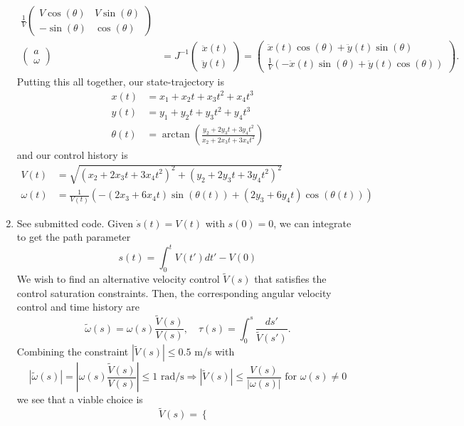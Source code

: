 \documentclass[12pt]{article}
\begin{document}
\begin{enumerate}
\begin{align*}
		\frac{1}{V}\left(\begin{array}{cc}
		V\cos(\theta) & V\sin(\theta) \\
		-\sin(\theta) & \cos(\theta)
		\end{array}\right) \\
		\left(\begin{array}{c}
		a \\
		\omega
		\end{array}\right) &=
		J^{-1}\left(\begin{array}{c}
		\ddot x(t) \\
		\ddot y(t)
		\end{array}\right) =
		\left(\begin{array}{c}
		\ddot x(t)\cos(\theta) + \ddot y(t)\sin(\theta) \\
		\frac{1}{V}(-\ddot x(t)\sin(\theta) + \ddot y(t)\cos(\theta))
		\end{array}\right).
	\end{align*}
	Putting this all together, our state-trajectory is
	\begin{align*}
		x(t) &= x_1 + x_2t + x_3t^2 + x_4t^3 \\
		y(t) &= y_1 + y_2t + y_3t^2 + y_4t^3 \\
		\theta(t) &= \arctan\left(\frac{y_2 + 2y_3t + 3y_4t^2}{x_2 + 2x_3t + 3x_4t^2}\right)
	\end{align*}
	and our control history is
	\begin{align*}
		V(t) &= \sqrt{(x_2 + 2x_3t + 3x_4t^2)^2 + (y_2 + 2y_3t + 3y_4t^2)^2} \\
		\omega(t) &= \frac{1}{V(t)}\left(-(2x_3 + 6x_4t)\sin(\theta(t)) + (2y_3 + 6y_4t)\cos(\theta(t))\right)
	\end{align*}
	\item See submitted code. Given $\dot s(t) = V(t)$ with $s(0) = 0$, we can integrate to get the path parameter
	\[
		s(t) = \int_0^t V(t')dt' - V(0)
	\]
	We wish to find an alternative velocity control $\tilde V(s)$ that satisfies the control saturation constraints. Then, the corresponding angular velocity control and time history are
	\[
		\tilde \omega(s) = \omega(s) \frac{\tilde V(s)}{V(s)}, \quad
		\tau(s) = \int_0^s \frac{ds'}{\tilde V(s')}.
	\]
	Combining the constraint $|\tilde V(s)| \leq 0.5$ m/s with
	\[
		|\tilde \omega(s)| = \left|\omega(s) \frac{\tilde V(s)}{V(s)}\right| \leq 1 \mbox{ rad/s} \Rightarrow |\tilde V(s)| \leq \frac{V(s)}{|\omega(s)|} \mbox{ for } \omega(s) \neq 0
	\]
	we see that a viable choice is
	\[
		\tilde V(s) = \begin{cases}

\end{cases}\]
\end{enumerate}
\end{document}
